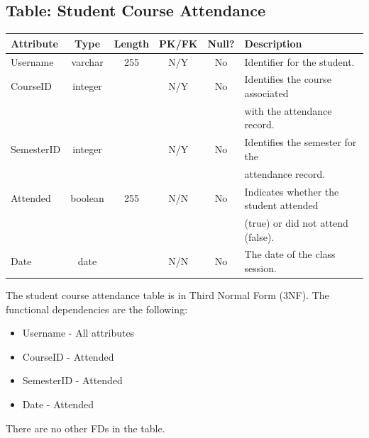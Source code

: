 \documentclass[letterpaper,12pt,oneside,listof=totoc]{scrreprt}
\begin{document}
\subsection{Table: Student Course Attendance}
\begin{table}[h]
    \centering
    \begin{tabular}{|l|c|c|c|c|l|}
        \hline
        \textbf{Attribute} & \textbf{Type} & \textbf{Length} & \textbf{PK/FK} & \textbf{Null?} & \textbf{Description}
        \\
        \hline
         Username & varchar & 255 & N/Y & No & Identifier for the student.
        \\
        \hline
        CourseID & integer &  & N/Y & No & Identifies the course associated \\ &&&&& with the attendance record.
        \\
        \hline
        SemesterID & integer &  & N/Y & No & Identifies the semester for the \\ &&&&& attendance record.
        \\
        \hline
        Attended & boolean & 255 & N/N & No & Indicates whether the student attended \\ &&&&& (true) or did not attend (false).
        \\
        \hline
        Date & date &  & N/N & No & The date of the class session. 
        \\
        \hline
    \end{tabular}
\end{table}

The student course attendance table is in Third Normal Form (3NF). The functional dependencies are the following:
\begin{itemize}
  \item Username - All attributes
  \item CourseID - Attended
  \item SemesterID - Attended 
  \item Date - Attended 
\end{itemize}
There are no other FDs in the table.

\newpage
\end{document}
